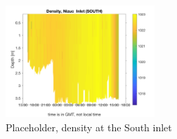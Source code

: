 \documentclass[11pt]{article}
\begin{document}
\begin{figure}[ht!]
\centerline{\includegraphics[width=0.5\textwidth]{images/density_nizuc_nichupte_southinlet.png}}
\internallinenumbers\caption{Placeholder, density at the South inlet}
\label{figDensityNizuc}
\end{figure}
\end{document}
